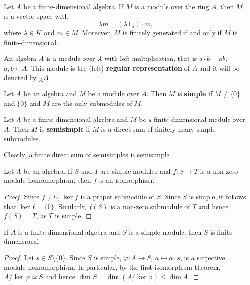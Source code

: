 Let $A$ be a finite-dimensional algebra. 
If $M$ is a module over the ring $A$, then $M$ is a vector space with  
\[
\lambda m=(\lambda 1_A)\cdot m, 
\]
where $\lambda\in K$ and $m\in M$. Moreover, $M$ is finitely generated if and only if $M$ is finite-dimensional.  


\begin{example}
An algebra  $A$ is a module over $A$ with left multiplication, that is $a\cdot b=ab$, $a,b\in A$.
This module is the (left) \textbf{regular representation} of $A$ and it will be denoted by $\prescript{}{A}{A}$. 
\end{example}

\begin{definition}
	Let $A$ be an algebra and $M$ be a module over $A$. Then 
	$M$ is \textbf{simple} if $M\ne\{0\}$ and $\{0\}$ and $M$ 
	are the only submodules of $M$.	
\end{definition}

\begin{definition}
	Let $A$ be a finite-dimensional 
	algebra and $M$ be a finite-dimensional module over $A$. Then 
	$M$ is \textbf{semisimple} if $M$ is a direct sum of 
	finitely many simple submodules.  
\end{definition}

Clearly, a finite direct sum of semisimples is semisimple. 

\begin{lemma}[Schur]
	Let $A$ be an algebra. If $S$ and $T$ are
	simple modules and $f\colon S\to T$ is a non-zero module homomorphism, 
	then $f$ is an isomorphism. 
\end{lemma}

\begin{proof}
Since $f\ne 0$, $\ker f$ is a proper submodule of $S$. Since $S$ is simple, it follows 
that $\ker f=\{0\}$. Similarly, $f(S)$ 
is a non-zero submodule of $T$ and hence $f(S)=T$, as $T$ is simple. 	
\end{proof}

\begin{proposition}
    If $A$ is a finite-dimensional algebra and $S$ is a simple module, then $S$ is finite-dimensional. 
\end{proposition}

\begin{proof}
    Let $s\in S\setminus\{0\}$. Since $S$ is simple, $\varphi\colon A\to S$, $a\mapsto a\cdot s$, is a surjective 
    module homomorphism. 
    In particular, by the first isomorphism theorem, $A/\ker\varphi\simeq S$ and hence $\dim S=\dim (A/\ker\varphi)\leq \dim A$. 
\end{proof}

